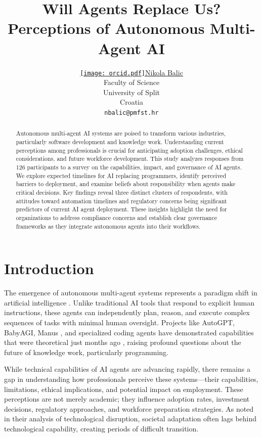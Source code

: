 \documentclass{article}
\title{Will Agents Replace Us? Perceptions of Autonomous Multi-Agent AI}
\author{ \href{https://orcid.org/0000-0002-4405-1470}{\texttt{[image: orcid.pdf]}\hspace{1mm}Nikola Balic} \\
	Faculty of Science\\
	University of Split\\
	Croatia \\
	\texttt{nbalic@pmfst.hr} \\
}
\begin{document}
\maketitle

\begin{abstract}
Autonomous multi-agent AI systems are poised to transform various
industries, particularly software development and knowledge work.
Understanding current perceptions among professionals is crucial for
anticipating adoption challenges, ethical considerations, and future
workforce development. This study analyzes responses from 126
participants to a survey on the capabilities, impact, and governance of
AI agents. We explore expected timelines for AI replacing programmers,
identify perceived barriers to deployment, and examine beliefs about
responsibility when agents make critical decisions. Key findings reveal
three distinct clusters of respondents, with attitudes toward automation
timelines and regulatory concerns being significant predictors of
current AI agent deployment. These insights highlight the need for
organizations to address compliance concerns and establish clear
governance frameworks as they integrate autonomous agents into their
workflows.
\end{abstract}




\section{Introduction}\label{introduction}

The emergence of autonomous multi-agent systems represents a paradigm shift in artificial intelligence \citep{Xi2023RisePotential}. Unlike traditional AI tools that respond to explicit human instructions, these agents can independently plan, reason, and execute complex sequences of tasks with minimal human oversight. Projects like AutoGPT, BabyAGI, Manus \citep{shen2025}, and specialized coding agents have demonstrated capabilities that were theoretical just months ago \citep{Liu2025AdvancesChallenges}, raising profound questions about the future of knowledge work, particularly programming.

While technical capabilities of AI agents are advancing rapidly, there
remains a gap in understanding how professionals perceive these
systems---their capabilities, limitations, ethical implications, and
potential impact on employment. These perceptions are not merely
academic; they influence adoption rates, investment decisions,
regulatory approaches, and workforce preparation strategies. As \cite{Brynjolfsson2014} noted in their analysis of technological
disruption, societal adaptation often lags behind technological
capability, creating periods of difficult transition.
\end{document}
